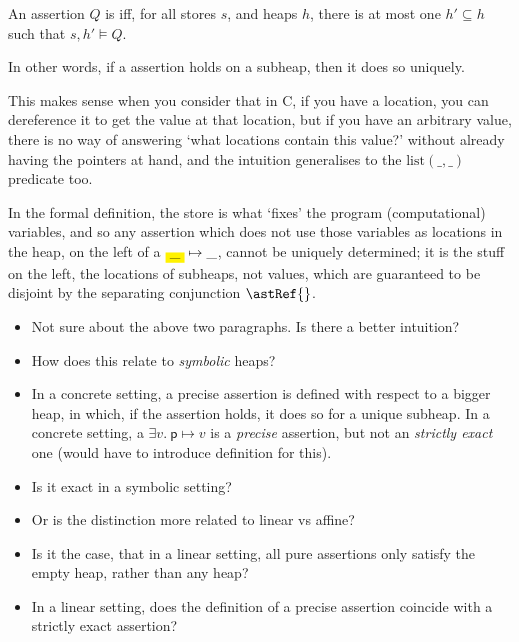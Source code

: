 \begin{definition}
    \AP{} An assertion $Q$ is  iff, for all stores $s$, and heaps
    $h$, there is at most one $h' \subseteq{} h$ such that $s , h' \vDash{} Q$.

    In other words, if a  assertion holds on a subheap, then it
    does so uniquely.
\end{definition}

This makes sense when you consider that in C, if you have a location, you can
dereference it to get the value at that location, but if you have an arbitrary
value, there is no way of answering `what locations contain this
value?'
without already having the pointers at hand, and the intuition generalises to
the $\mathrm{list}(\_, \_)$ predicate too.

In the formal definition, the store is what `fixes' the program (computational)
variables, and so any assertion which does not use those variables as locations
in the heap, on the left of a $\colorbox{yellow}{\_} \mapsto{} \_$, cannot be
uniquely determined; it is the stuff on the left, the locations of subheaps,
not values, which are guaranteed to be disjoint by the separating conjunction
$\astRef{}$.

\begin{itemize}
    \item Not sure about the above two paragraphs. Is there a better intuition?
    \item How does this relate to \emph{symbolic} heaps?
    \item In a concrete setting, a precise assertion is defined with respect to
        a bigger heap, in which, if the assertion holds, it does so for a
        unique subheap. In a concrete setting, a $\exists v.\ \mathsf{p}
        \mapsto{} v$ is a \emph{precise} assertion, but not an \emph{strictly
        exact} one (would have to introduce definition for this).
    \item Is it exact in a symbolic setting?
    \item Or is the distinction more related to linear vs affine?
    \item Is it the case, that in a linear setting, all pure assertions only
        satisfy the empty heap, rather than any heap?
    \item In a linear setting, does the definition of a precise assertion
        coincide with a strictly exact assertion?
\end{itemize}

